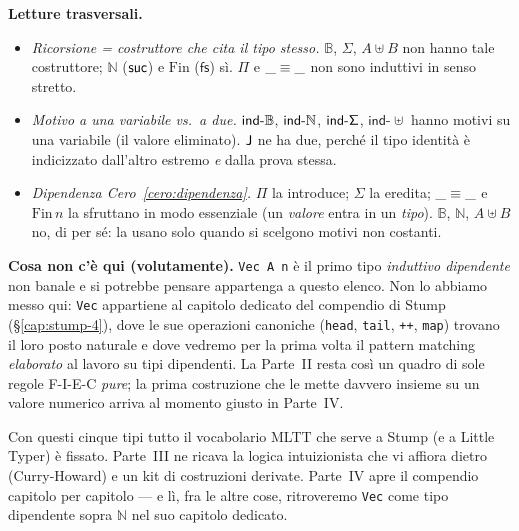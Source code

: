 \medskip

\noindent\textbf{Letture trasversali.}
\begin{itemize}
\item \emph{Ricorsione = costruttore che cita il tipo stesso.} $\mathbb{B}$, $\Sigma$, $A \uplus B$ non hanno tale costruttore; $\mathbb{N}$ ($\mathsf{suc}$) e $\mathrm{Fin}$ ($\mathsf{fs}$) s\`i. $\Pi$ e $\_\equiv\_$ non sono induttivi in senso stretto.
\item \emph{Motivo a una variabile vs.\ a due.} $\mathsf{ind\text{-}\mathbb{B}}$, $\mathsf{ind\text{-}\mathbb{N}}$, $\mathsf{ind\text{-}\Sigma}$, $\mathsf{ind}\text{-}\uplus$ hanno motivi su una variabile (il valore eliminato). $\mathsf{J}$ ne ha due, perch\'e il tipo identit\`a \`e indicizzato dall'altro estremo \emph{e} dalla prova stessa.
\item \emph{Dipendenza Cero~\ref{cero:dipendenza}.} $\Pi$ la introduce; $\Sigma$ la eredita; $\_\equiv\_$ e $\mathrm{Fin}\,n$ la sfruttano in modo essenziale (un \emph{valore} entra in un \emph{tipo}). $\mathbb{B}$, $\mathbb{N}$, $A \uplus B$ no, di per s\'e: la usano solo quando si scelgono motivi non costanti.
\end{itemize}

\bigskip

\noindent\textbf{Cosa non c'\`e qui (volutamente).} \texttt{Vec A n} \`e il primo tipo \emph{induttivo dipendente} non banale e si potrebbe pensare appartenga a questo elenco. Non lo abbiamo messo qui: \texttt{Vec} appartiene al capitolo dedicato del compendio di Stump (\S\ref{cap:stump-4}), dove le sue operazioni canoniche (\texttt{head}, \texttt{tail}, \texttt{++}, \texttt{map}) trovano il loro posto naturale e dove vedremo per la prima volta il pattern matching \emph{elaborato} al lavoro su tipi dipendenti. La Parte~II resta cos\`i un quadro di sole regole F-I-E-C \emph{pure}; la prima costruzione che le mette davvero insieme su un valore numerico arriva al momento giusto in Parte~IV.

\bigskip

\noindent Con questi cinque tipi tutto il vocabolario MLTT che serve a Stump (e a Little Typer) \`e fissato. Parte~III ne ricava la logica intuizionista che vi affiora dietro (Curry-Howard) e un kit di costruzioni derivate. Parte~IV apre il compendio capitolo per capitolo --- e l\`i, fra le altre cose, ritroveremo \texttt{Vec} come tipo dipendente sopra $\mathbb{N}$ nel suo capitolo dedicato.